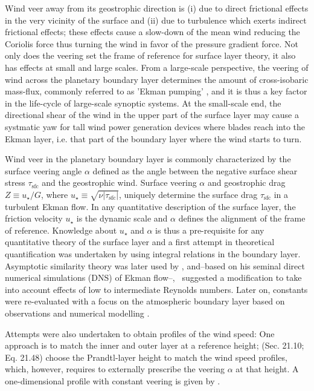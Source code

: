\documentclass[a4paper,11pt]{amsart}
\newcommand{\SFC}{\mathrm{sfc}}
\begin{document}
Wind veer away from its geostrophic direction is
(i) due to direct frictional effects in the very vicinity of the surface and
(ii) due to turbulence which exerts indirect frictional effects; these effects
cause a slow-down of the mean wind reducing the Coriolis force thus turning the wind
in favor of the pressure gradient force. 
Not only does the veering set the frame of reference for surface layer theory, it also has
effects at small and large scales.
%
From a large-scale perspective, the veering of wind across the planetary boundary layer determines
the amount of cross-isobaric mass-flux, commonly referred to as 'Ekman pumping' \citep{ekman:AMA1905},
and it is thus a key factor in the life-cycle of large-scale synoptic systems.
%
% 
At the small-scale end, the directional shear of the wind in the upper part of the surface layer
may cause a systmatic yaw for tall wind power generation devices where blades reach into the Ekman layer,
i.e. that part of the boundary layer where the wind starts to turn. 
%
\par
%
Wind veer in the planetary boundary layer is commonly characterized by the surface veering angle $\alpha$
defined as the angle between the negative surface shear stress $\tau_\SFC$ and the geostrophic wind.
%
Surface veering $\alpha$ and geostrophic drag $Z\equiv u_\star/G$, where $u_\star\equiv\sqrt{\nu|\tau_\SFC|}$,
uniquely determine the surface drag $\tau_\SFC$ in a turbulent Ekman flow. 
%
In any quantitative description of the surface layer, the friction velocity $u_\star$ is the dynamic scale
and $\alpha$ defines the alignment of the frame of reference.
%
Knowledge about $u_\star$ and $\alpha$ is thus a pre-requisite for any quantitative theory of the surface layer and a first
attempt in theoretical quantification was undertaken by \citet{rossby:PPO1935} using integral relations in the boundary layer.
%
Asymptotic similarity theory was later used by \citet{tennekes:JAS1973, blackadar:JAS1968},
and--based on his seminal direct numerical simulations (DNS) of Ekman flow--,~\cite{spalart:JFM1989} suggested
a modification to take into account effects of low to intermediate Reynolds numbers.
Later on, constants were re-evaluated with a focus on the atmospheric boundary layer based on
observations \citep{hogstrom:BM1988,hogstrom:BM1996}
and numerical modelling \citep{spalart:PF2008, spalart:PF2009, ansorge:BM2014, ansorge:BM2019}. 
%
\par
%
Attempts were also undertaken to obtain profiles of the wind speed: 
One approach is to match the inner and outer layer at a reference height;
\citet{etling:2002, emeis:2018}  (Sec. 21.10; Eq. 21.48) choose the Prandtl-layer height to match
the wind speed profiles, which, however, requires to externally prescribe the veering $\alpha$ at that height. 
A one-dimensional profile with constant veering is given by \citet[Sec. 3; Eq. 3.1-3.19]{emeis:m2007}. 
\end{document}
